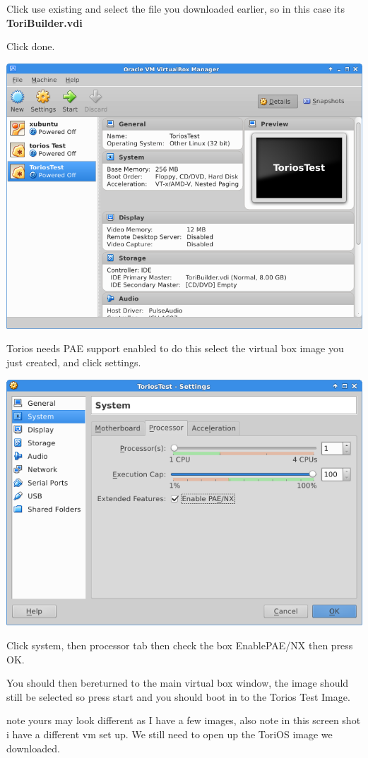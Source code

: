 \documentclass[12pt,a4paper]{book}
\begin{document}
Click use existing and select the file you downloaded earlier, so in this case its \textbf{ToriBuilder.vdi}

Click done.

\begin{center}
\includegraphics[width=0.7\linewidth]{ToriosTest-done}
\end{center}

Torios needs PAE support enabled to do this select the virtual box image you just created,  and click settings.

\begin{center}
\includegraphics[width=0.7\linewidth]{ToriosEnablePAE}
\end{center}

Click system, then processor tab then check the box EnablePAE/NX then press OK.

You should then bereturned to the main virtual box window,  the image should still be selected so press start and you should boot in to the Torios Test Image. 

 note yours may look different as I have a few images,  also note in this screen shot i have a different vm set up.  We still need to open up the ToriOS image we downloaded. 
\end{document}
